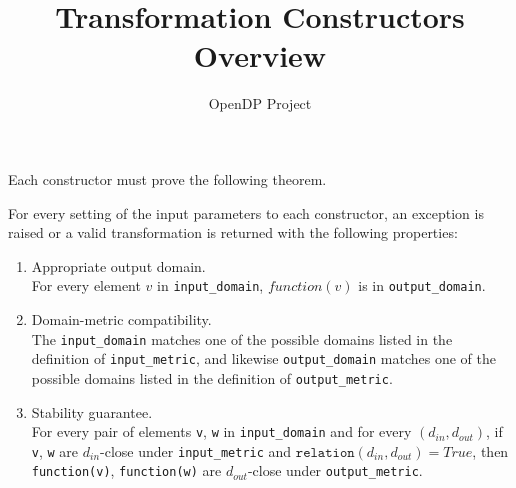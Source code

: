 

\title{Transformation Constructors Overview}
\author{OpenDP Project}


\maketitle

Each constructor must prove the following theorem.

\begin{theorem}
\label{thrm:privacy-proof}
    For every setting of the input parameters to each constructor,
    an exception is raised or a valid transformation is returned with the following properties:
    \begin{enumerate}
        \item \textup{Appropriate output domain.} \\
        For every element $v$ in \texttt{input\_domain}, $function(v)$ is in \texttt{output\_domain}.
        
        \item \textup{Domain-metric compatibility.} \\
        The \texttt{input\_domain} matches one of the possible domains listed in the definition of \texttt{input\_metric}, 
        and likewise \texttt{output\_domain} matches one of the possible domains listed in the definition of \texttt{output\_metric}.
        
        \item \textup{Stability guarantee.} \\
        For every pair of elements \texttt{v}, \texttt{w} in \texttt{input\_domain} and for every $(d_{in}, d_{out})$,
        if \texttt{v}, \texttt{w} are $d_{in}$-close under \texttt{input\_metric} and $\texttt{relation}(d_{in}, d_{out}) = True$,
        then \texttt{function(v)}, \texttt{function(w)} are $d_{out}$-close under \texttt{output\_metric}.
    \end{enumerate}
\end{theorem}

